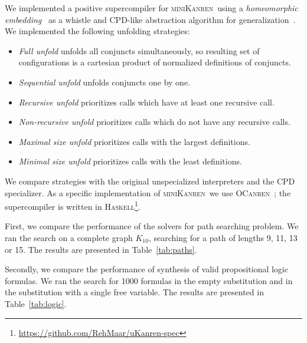 \documentclass[submission,copyright,creativecommons]{eptcs}
\newcommand{\miniKanren}{\textsc{miniKanren}\ }
\begin{document}
We implemented a positive supercompiler for \miniKanren using a {\it homeomorphic embedding}~\cite{homeoEmb} as a whistle
and CPD-like abstraction algorithm for generalization~\cite{cpd}.
We implemented the following unfolding strategies:
\begin{itemize}
\item {\it Full unfold} unfolds all conjuncts simultaneously, so
      resulting set of configurations is a cartesian product of normalized definitions of conjuncts.
\item {\it Sequential unfold} unfolds conjuncts one by one.
\item {\it Recursive unfold}     prioritizes calls which have at least one recursive call.
\item {\it Non-recursive unfold} prioritizes calls which do not have any recursive calls.
\item {\it Maximal size unfold}  prioritizes calls with the largest definitions.
\item {\it Minimal size unfold}  prioritizes calls with the least definitions.
\end{itemize}


We compare strategies with the original unspecialized interpreters and the CPD specializer.
As a specific implementation of \miniKanren we use \textsc{OCanren}~\cite{ocanren};
the supercompiler is written in \textsc{Haskell}\footnote{\url{https://github.com/RehMaar/uKanren-spec}}.

First, we compare the performance of the solvers for path searching problem. We ran the search on a complete graph $K_{10}$,
searching for a path of lengths 9, 11, 13 or 15. The results are presented in Table~\ref{tab:paths}.

Secondly, we compare the performance of synthesis of valid propositional logic formulas. We ran the search for 1000 formulas
in the empty substitution and in the substitution with a single free variable. The results are presented in Table~\ref{tab:logic}.
\end{document}
